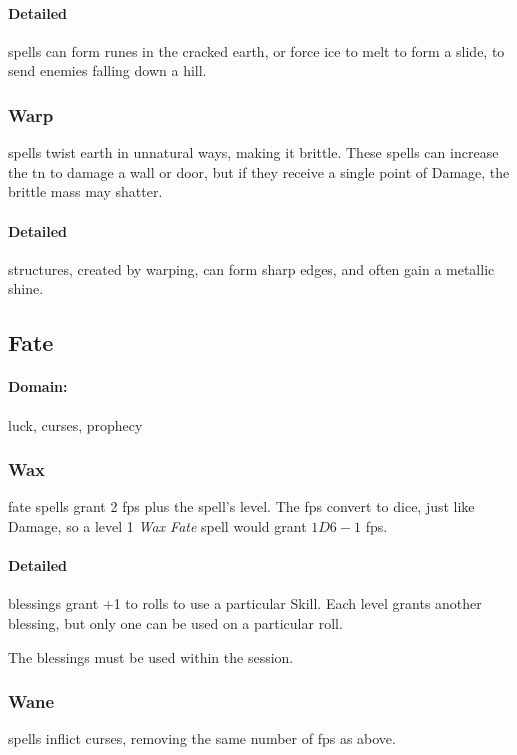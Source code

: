 \begin{multicols}{2}
\paragraph{Detailed}
spells can form runes in the cracked earth, or force ice to melt to form a slide, to send enemies falling down a hill.

\subsubsection{Warp}
spells twist earth in unnatural ways, making it brittle.
These spells can increase the \gls{tn} to damage a wall or door, but if they receive a single point of Damage, the brittle mass may shatter.

\paragraph{Detailed}
structures, created by warping, can form sharp edges, and often gain a metallic shine.

\subsection{Fate}
\paragraph{Domain:}
luck, curses, prophecy

\subsubsection{Wax}
fate spells grant 2 \glspl{fp} plus the spell's level.
The \glspl{fp} convert to dice, just like Damage, so a level 1 \textit{Wax Fate} spell would grant $1D6-1$ \glspl{fp}.

\paragraph{Detailed}
blessings grant +1 to rolls to use a particular Skill.
Each level grants another blessing, but only one can be used on a particular roll.

The blessings must be used within the session.

\subsubsection{Wane}
spells inflict curses, removing the same number of \glspl{fp} as above.


\end{multicols}
